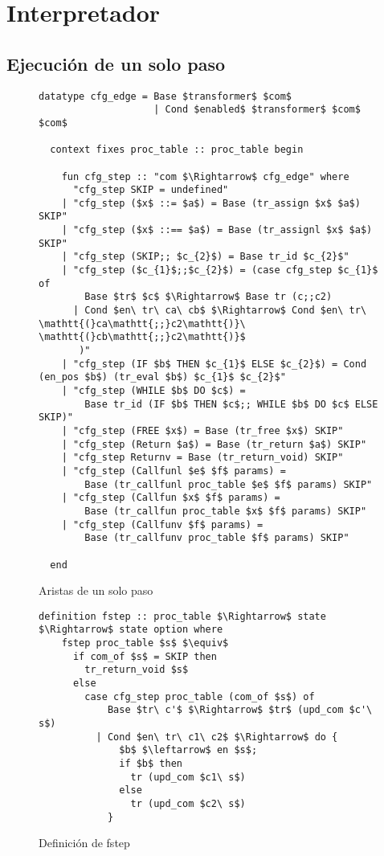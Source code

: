 \section{Interpretador}\label{section:interpreter}

\subsection{Ejecución de un solo paso}\label{subsection:single_step}

\begin{figure}
  \begin{lstlisting}[frame=single, mathescape=true]
  datatype cfg_edge = Base $transformer$ $com$
                    | Cond $enabled$ $transformer$ $com$ $com$

  context fixes proc_table :: proc_table begin

    fun cfg_step :: "com $\Rightarrow$ cfg_edge" where
      "cfg_step SKIP = undefined"
    | "cfg_step ($x$ ::= $a$) = Base (tr_assign $x$ $a$) SKIP"
    | "cfg_step ($x$ ::== $a$) = Base (tr_assignl $x$ $a$) SKIP"
    | "cfg_step (SKIP;; $c_{2}$) = Base tr_id $c_{2}$"
    | "cfg_step ($c_{1}$;;$c_{2}$) = (case cfg_step $c_{1}$ of
        Base $tr$ $c$ $\Rightarrow$ Base tr (c;;c2)
      | Cond $en\ tr\ ca\ cb$ $\Rightarrow$ Cond $en\ tr\ \mathtt{(}ca\mathtt{;;}c2\mathtt{)}\ \mathtt{(}cb\mathtt{;;}c2\mathtt{)}$
       )"
    | "cfg_step (IF $b$ THEN $c_{1}$ ELSE $c_{2}$) = Cond (en_pos $b$) (tr_eval $b$) $c_{1}$ $c_{2}$"
    | "cfg_step (WHILE $b$ DO $c$) =
        Base tr_id (IF $b$ THEN $c$;; WHILE $b$ DO $c$ ELSE SKIP)"
    | "cfg_step (FREE $x$) = Base (tr_free $x$) SKIP"
    | "cfg_step (Return $a$) = Base (tr_return $a$) SKIP"
    | "cfg_step Returnv = Base (tr_return_void) SKIP"
    | "cfg_step (Callfunl $e$ $f$ params) =
        Base (tr_callfunl proc_table $e$ $f$ params) SKIP"
    | "cfg_step (Callfun $x$ $f$ params) =
        Base (tr_callfun proc_table $x$ $f$ params) SKIP"
    | "cfg_step (Callfunv $f$ params) =
        Base (tr_callfunv proc_table $f$ params) SKIP"

  end
  \end{lstlisting}

  \caption{Aristas de un solo paso}
  \label{fig:single_step_edges}
\end{figure}

\begin{figure}
  \begin{lstlisting}[frame=single, mathescape=true]
  definition fstep :: proc_table $\Rightarrow$ state $\Rightarrow$ state option where
    fstep proc_table $s$ $\equiv$
      if com_of $s$ = SKIP then
        tr_return_void $s$
      else
        case cfg_step proc_table (com_of $s$) of
            Base $tr\ c'$ $\Rightarrow$ $tr$ (upd_com $c'\ s$)
          | Cond $en\ tr\ c1\ c2$ $\Rightarrow$ do {
              $b$ $\leftarrow$ en $s$;
              if $b$ then
                tr (upd_com $c1\ s$)
              else  
                tr (upd_com $c2\ s$)
            }
  \end{lstlisting}

  \caption{Definición de fstep}
  \label{fig:fstep_def}
\end{figure}

